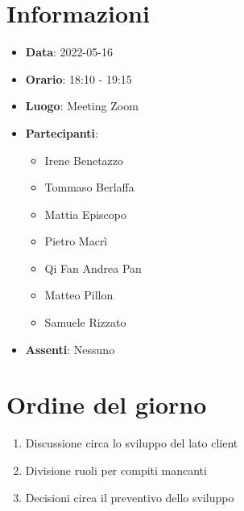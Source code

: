 \section{Informazioni}
	\begin{itemize}
		\item \textbf{Data}: 2022-05-16     %
		\item \textbf{Orario}:       18:10 - 19:15       %
		\item \textbf{Luogo}: Meeting Zoom
		\item \textbf{Partecipanti}:
		\begin{itemize}
			\item Irene Benetazzo
			\item Tommaso Berlaffa
			\item Mattia Episcopo
			\item Pietro Macrì
			\item Qi Fan Andrea Pan
			\item Matteo Pillon
			\item Samuele Rizzato
		\end{itemize}
        \item \textbf{Assenti}: Nessuno
	\end{itemize}
    
	\section{Ordine del giorno}
	\begin{enumerate}
		\item Discussione circa lo sviluppo del lato client
  		\item Divisione ruoli per compiti mancanti
   	 	\item Decisioni circa il preventivo dello sviluppo
	\end{enumerate}
	\newpage